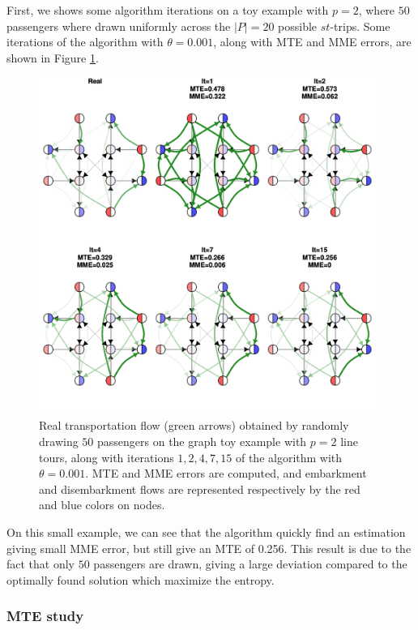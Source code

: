 \documentclass{bmcart}
\begin{document}
First, we shows some algorithm iterations on a toy example with $p=2$, where $50$ passengers where drawn uniformly across the $\vert P \vert = 20$ possible $st$-trips. Some iterations of the algorithm with $\theta=0.001$, along with MTE and MME errors, are shown in Figure \ref{iteration_plots}. 
\begin{figure}[h]
	\includegraphics[width=0.98\textwidth]{fig/iterations.pdf}
	\caption{Real transportation flow (green arrows) obtained by randomly drawing $50$ passengers on the graph toy example with $p=2$ line tours, along with iterations $1, 2, 4, 7, 15$ of the algorithm with $\theta=0.001$. MTE and MME errors are computed, and embarkment and disembarkment flows are represented respectively by the red and blue colors on nodes.}
	\label{iteration_plots}
\end{figure}
On this small example, we can see that the algorithm quickly find an estimation giving small MME error, but still give an MTE of 0.256. This result is due to the fact that only $50$ passengers are drawn, giving a large deviation compared to the optimally found solution which maximize the entropy.

\subsubsection{MTE study}
\label{mte_study}
\end{document}
